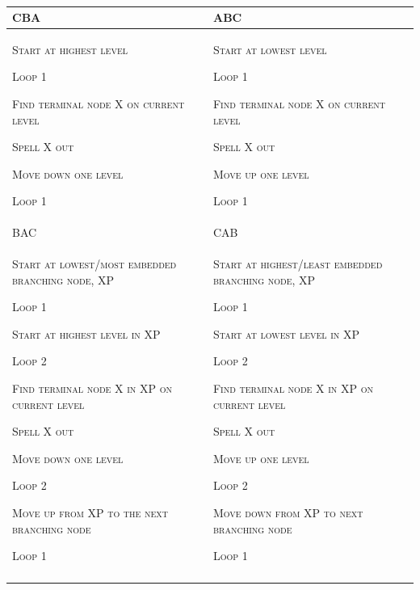   \begin{table}
\begin{tabularx}{\textwidth}{XX}
\lsptoprule
CBA & ABC\\
\midrule 
\textsc{Start at highest level}

\textsc{Loop 1}

     \textsc{Find terminal node X on current level}

     \textsc{Spell X out}

     \textsc{Move down one level}

\textsc{Loop 1} & \textsc{Start at lowest level}

\textsc{Loop 1}

     \textsc{Find terminal node X on current level}

     \textsc{Spell X out}

     \textsc{Move up one level}

\textsc{Loop 1}\\
BAC & CAB\\
\textsc{Start at lowest}\textsc{/}\textsc{most embedded branching node, XP}

\textsc{Loop 1}

      \textsc{Start at highest level in XP}

      \textsc{Loop 2}

         \textsc{Find terminal node X in XP on current level}

         \textsc{Spell X out}

         \textsc{Move down one level}

      \textsc{Loop 2}

      \textsc{Move up from XP to the next branching node}

\textsc{Loop 1} & \textsc{Start at highest}\textsc{/}\textsc{least embedded branching node, XP}

\textsc{Loop 1}

      \textsc{Start at lowest level in XP}

      \textsc{Loop 2}

         \textsc{Find terminal node X in XP on current level}

         \textsc{Spell X out}

         \textsc{Move up one level}

      \textsc{Loop 2}

      \textsc{Move down from XP to next branching node}

\textsc{Loop 1}\\
\lspbottomrule
\end{tabularx}
\caption{\missingcaption}\label{tab:3:1}
\end{table}

